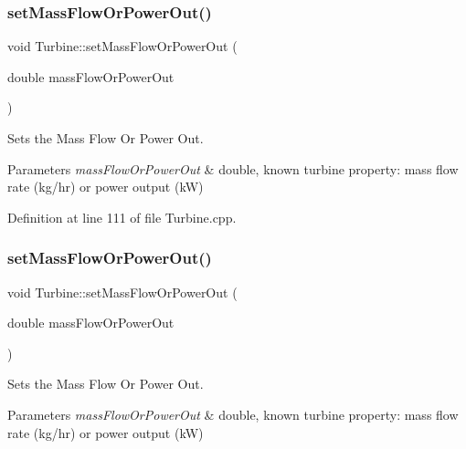 \subsubsection{\texorpdfstring{set\+Mass\+Flow\+Or\+Power\+Out()}{setMassFlowOrPowerOut()}\hspace{0.1cm}{\footnotesize\ttfamily [2/3]}}
{\footnotesize\ttfamily void Turbine\+::set\+Mass\+Flow\+Or\+Power\+Out (\begin{DoxyParamCaption}\item[{double}]{mass\+Flow\+Or\+Power\+Out }\end{DoxyParamCaption})}



Sets the Mass Flow Or Power Out. 


\begin{DoxyParams}{Parameters}
{\em mass\+Flow\+Or\+Power\+Out} & double, known turbine property\+: mass flow rate (kg/hr) or power output (kW) \\
\hline
\end{DoxyParams}


Definition at line 111 of file Turbine.\+cpp.

\mbox{\label{class_turbine_a73522631e2eeefa8ea14d5b537e3e760}} 
\subsubsection{\texorpdfstring{set\+Mass\+Flow\+Or\+Power\+Out()}{setMassFlowOrPowerOut()}\hspace{0.1cm}{\footnotesize\ttfamily [3/3]}}
{\footnotesize\ttfamily void Turbine\+::set\+Mass\+Flow\+Or\+Power\+Out (\begin{DoxyParamCaption}\item[{double}]{mass\+Flow\+Or\+Power\+Out }\end{DoxyParamCaption})}



Sets the Mass Flow Or Power Out. 


\begin{DoxyParams}{Parameters}
{\em mass\+Flow\+Or\+Power\+Out} & double, known turbine property\+: mass flow rate (kg/hr) or power output (kW) \\
\hline
\end{DoxyParams}
\mbox{\label{class_turbine_ad5ff4ba1657aac9519a6841336ec571c}} 
